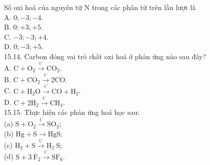 \documentclass[10pt]{article}
\begin{document}
Số oxi hoá của nguyên tử N trong các phân tử trên lần lượt là\\
A. $0 ;-3 ;-4$.\\
B. $0 ;+3 ;+5$.\\
C. $-3 ;-3 ;+4$.\\
D. $0 ;-3 ;+5$.\\
15.14. Carbon đóng vai trò chất oxi hoá ở phản ứng nào sau đây?\\
A. $\mathrm{C}+\mathrm{O}_{2} \xrightarrow{\mathrm{t}^{\circ}} \mathrm{CO}_{2}$.\\
B. $\mathrm{C}+\mathrm{CO}_{2} \xrightarrow{\mathrm{t}^{\circ}} 2 \mathrm{CO}$.\\
C. $\mathrm{C}+\mathrm{H}_{2} \mathrm{O} \xrightarrow{\mathrm{t}^{\circ}} \mathrm{CO}+\mathrm{H}_{2}$.\\
D. $\mathrm{C}+2 \mathrm{H}_{2} \xrightarrow{\mathrm{t}^{\circ}} \mathrm{CH}_{4}$.\\
15.15. Thực hiện các phản ứng hoá học sau:\\
(a) $\mathrm{S}+\mathrm{O}_{2} \xrightarrow{\mathrm{t}^{\circ}} \mathrm{SO}_{2}$;\\
(b) $\mathrm{Hg}+\mathrm{S} \longrightarrow \mathrm{HgS}$;\\
(c) $\mathrm{H}_{2}+\mathrm{S} \xrightarrow{\mathrm{t}^{\circ}} \mathrm{H}_{2} \mathrm{~S}$;\\
(d) $\mathrm{S}+3 \mathrm{~F}_{2} \xrightarrow{\mathrm{t}^{\circ}} \mathrm{SF}_{6}$.
\end{document}
